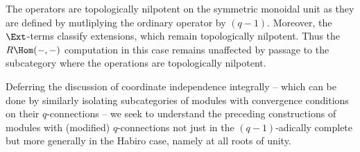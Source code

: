 \begin{remark}
    The operators are topologically nilpotent on the symmetric monoidal unit as they are defined by mutliplying the ordinary operator by $(q-1)$. Moreover, the $\Ext$-terms classify extensions, which remain topologically nilpotent. Thus the $R\Hom(-,-)$ computation in this case remains unaffected by passage to the subcategory where the operations are topologically nilpotent. 
\end{remark}
Deferring the discussion of coordinate independence integrally -- which can be done by similarly isolating subcategories of modules with convergence conditions on their $q$-connections -- we seek to understand the preceding constructions of modules with (modified) $q$-connections not just in the $(q-1)$-adically complete but more generally in the Habiro case, namely at all roots of unity. 

